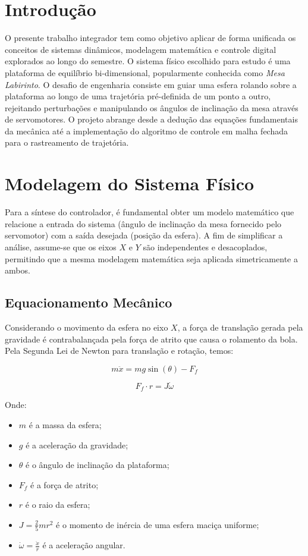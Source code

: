 \documentclass[12pt]{article}
\begin{document}
\section{Introdução}
O presente trabalho integrador tem como objetivo aplicar de forma unificada os conceitos de sistemas dinâmicos, modelagem matemática e controle digital explorados ao longo do semestre. O sistema físico escolhido para estudo é uma plataforma de equilíbrio bi-dimensional, popularmente conhecida como \textit{Mesa Labirinto}. O desafio de engenharia consiste em guiar uma esfera rolando sobre a plataforma ao longo de uma trajetória pré-definida de um ponto a outro, rejeitando perturbações e manipulando os ângulos de inclinação da mesa através de servomotores. O projeto abrange desde a dedução das equações fundamentais da mecânica até a implementação do algoritmo de controle em malha fechada para o rastreamento de trajetória.

\section{Modelagem do Sistema Físico}

Para a síntese do controlador, é fundamental obter um modelo matemático que relacione a entrada do sistema (ângulo de inclinação da mesa fornecido pelo servomotor) com a saída desejada (posição da esfera). A fim de simplificar a análise, assume-se que os eixos $X$ e $Y$ são independentes e desacoplados, permitindo que a mesma modelagem matemática seja aplicada simetricamente a ambos.

\subsection{Equacionamento Mecânico}
Considerando o movimento da esfera no eixo $X$, a força de translação gerada pela gravidade é contrabalançada pela força de atrito que causa o rolamento da bola. Pela Segunda Lei de Newton para translação e rotação, temos:

\begin{equation}
    m \ddot{x} = m g \sin(\theta) - F_f
\end{equation}

\begin{equation}
    F_f \cdot r = J \dot{\omega}
\end{equation}

Onde:
\begin{itemize}
    \item $m$ é a massa da esfera;
    \item $g$ é a aceleração da gravidade;
    \item $\theta$ é o ângulo de inclinação da plataforma;
    \item $F_f$ é a força de atrito;
    \item $r$ é o raio da esfera;
    \item $J = \frac{2}{5}mr^2$ é o momento de inércia de uma esfera maciça uniforme;
    \item $\dot{\omega} = \frac{\ddot{x}}{r}$ é a aceleração angular.
\end{itemize}
\end{document}
